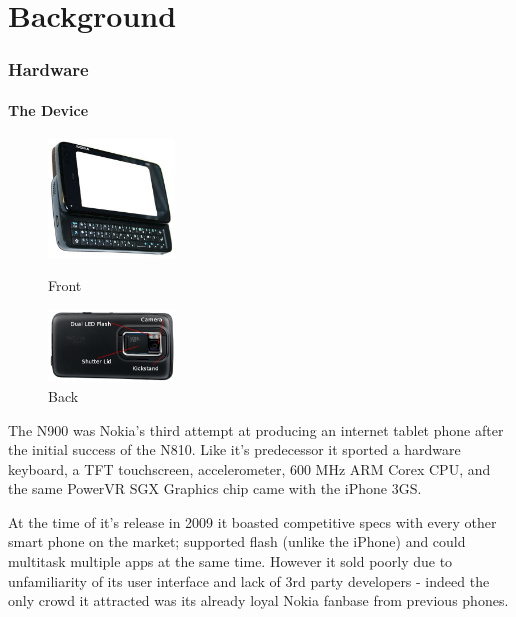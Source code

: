 \part{Background}
\section{Hardware}

\subsection{The Device}

\begin{figure}
	\vspace{-40pt}
	\begin{center}
		\includegraphics[width=0.3\textwidth]{../images/wiki_n900}
	\end{center}
	\vspace{-20pt}
	\caption{Front}
	\vspace{30pt}
	\begin{center}
		\includegraphics[width=0.3\textwidth]{../images/N900back}
	\end{center}
	\vspace{-20pt}
	\caption{Back}
\end{figure}

The N900 was Nokia's third attempt at producing an internet tablet phone after the initial success of the N810. Like it's predecessor it sported a hardware keyboard, a TFT touchscreen, accelerometer, 600 MHz ARM Corex CPU, and the same PowerVR SGX Graphics chip came with the iPhone 3GS.

At the time of it's release in 2009 it boasted competitive specs with every other smart phone on the market; supported flash (unlike the iPhone) and could multitask multiple apps at the same time. However it sold poorly due to unfamiliarity of its user interface and lack of 3rd party developers - indeed the only crowd it attracted was its already loyal Nokia fanbase from previous phones.


